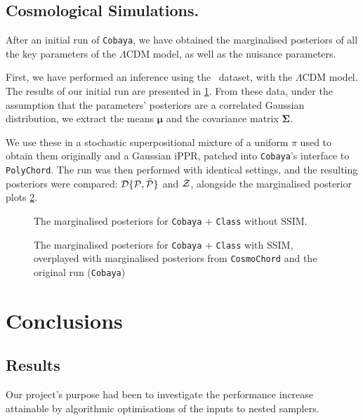 \documentclass[usenatbib]{mnras}
\begin{document}
\subsection{Cosmological Simulations.}\label{sec:orgb81c159}
After an initial run of \texttt{Cobaya}, we have obtained the marginalised
posteriors of all the key parameters of the \(\Lambda\)CDM model,
as well as the nuisance parameters.

First, we have performed an inference using the~\cite{Planck} dataset,
with the \(\Lambda\)CDM model. The results of our initial run are
presented in \cref{fig:cosmology}. From these data, under the
assumption that the parameters' posteriors are a correlated Gaussian
distribution, we extract the means $\bm{\mu}$ and the covariance
matrix \(\bm{\Sigma}\).

We use these in a stochastic superpositional mixture of a uniform
$\pi$ used to obtain them originally and a Gaussian iPPR, patched into
\texttt{Cobaya}'s interface to \texttt{PolyChord}. The run was then
performed with identical settings, and the resulting posteriors were
compared: ${\cal D}\{ {\cal P}, \bar{\cal P}\}$ and ${\cal Z}$,
alongside the marginalised posterior plots \cref{fig:cosmology-cmp}. 
\begin{landscape}
\begin{figure}
  \centering %
  
  \caption{The marginalised posteriors for \texttt{Cobaya} +
    \texttt{Class} without SSIM. }\label{fig:cosmology}
\end{figure}
\end{landscape}

\begin{landscape}
\begin{figure}
  \centering %
  \caption{The marginalised posteriors for \texttt{Cobaya} +
    \texttt{Class} with SSIM, overplayed with marginalised posteriors
    from \texttt{CosmoChord} and the original run
    (\texttt{Cobaya})}\label{fig:cosmology-cmp}
\end{figure}
\end{landscape}

\section{Conclusions}\label{sec:orgdf2cbd9}

\subsection{Results}\label{sec:orgc48c55d}
Our project's purpose had been to investigate the performance
increase attainable by algorithmic optimisations of the inputs to
nested samplers.
\end{document}
